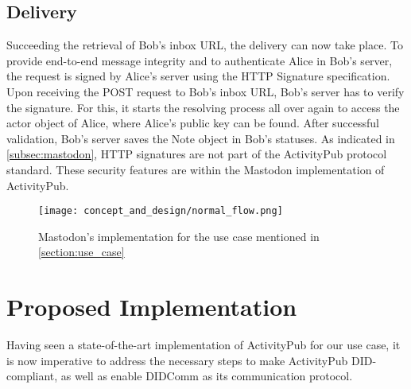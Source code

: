 \subsection{Delivery}
Succeeding the retrieval of Bob's inbox URL, the delivery can now take place. To provide end-to-end message integrity and to authenticate Alice in Bob's server, the request is signed by Alice's server using the HTTP Signature specification. Upon receiving the POST request to Bob's inbox URL, Bob's server has to verify the signature. For this, it starts the resolving process all over again to access the actor object of Alice, where Alice's public key can be found. After successful validation, Bob's server saves the Note object in Bob's statuses.
As indicated in \autoref{subsec:mastodon}, HTTP signatures are not part of the ActivityPub protocol standard. These security features are within the Mastodon implementation of ActivityPub.

\begin{figure}[H]
  \centering
  \texttt{[image: concept\_and\_design/normal\_flow.png]}
  \caption{Mastodon's implementation for the use case mentioned in \ref{section:use_case}}
  \label{fig:normal_flow}
\end{figure}

\pagebreak

\section{Proposed Implementation}\label{section:did_flow}
Having seen a state-of-the-art implementation of ActivityPub for our use case, it is now imperative to address the necessary steps to make ActivityPub DID-compliant, as well as enable DIDComm as its communication protocol. 


